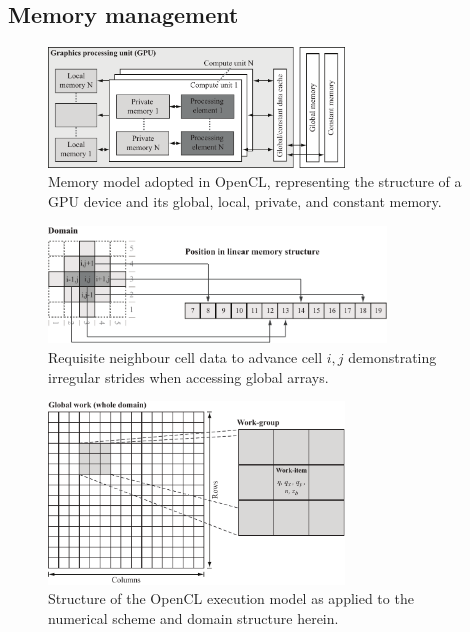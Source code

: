 \documentclass[11pt,english,a4paper]{article}
\begin{document}
\subsection{Memory management}

\begin{figure}[tb]
\centering
\includegraphics[width=0.7\textwidth]{Figure_2_Greyscale.pdf}
\caption{Memory model adopted in OpenCL, representing the structure of a GPU device and its global, local, private, and constant memory.}
\label{OpenCLStructure}
\end{figure}
\begin{figure}[tbh]
\centering
\includegraphics[width=0.8\textwidth]{Figure_3_Greyscale.pdf}
\caption{Requisite neighbour cell data to advance cell \(i,j\) demonstrating irregular strides when accessing global arrays.}
\label{RequisiteCellData}
\end{figure}
\begin{figure}[tbh]
\centering
\includegraphics[width=0.7\textwidth]{Figure_4_Greyscale.pdf}
\caption{Structure of the OpenCL execution model as applied to the numerical scheme and domain structure herein.}
\label{OpenCLExecStructure}
\end{figure}
\end{document}
